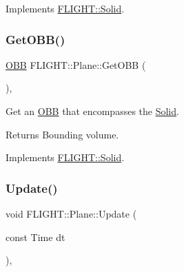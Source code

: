 Implements \hyperlink{class_f_l_i_g_h_t_1_1_solid_ae5db89380caf480ae8f5b203dab13e5b}{F\+L\+I\+G\+H\+T\+::\+Solid}.

\mbox{\label{class_f_l_i_g_h_t_1_1_plane_aaef56e8e418918a941ae740bbc818518}} 
\subsubsection{\texorpdfstring{Get\+O\+B\+B()}{GetOBB()}}
{\footnotesize\ttfamily \hyperlink{class_f_l_i_g_h_t_1_1_o_b_b}{O\+BB} F\+L\+I\+G\+H\+T\+::\+Plane\+::\+Get\+O\+BB (\begin{DoxyParamCaption}{ }\end{DoxyParamCaption})\hspace{0.3cm}{\ttfamily [override]}, {\ttfamily [virtual]}}



Get an \hyperlink{class_f_l_i_g_h_t_1_1_o_b_b}{O\+BB} that encompasses the \hyperlink{class_f_l_i_g_h_t_1_1_solid}{Solid}. 

\begin{DoxyReturn}{Returns}
Bounding volume. 
\end{DoxyReturn}


Implements \hyperlink{class_f_l_i_g_h_t_1_1_solid_a8234bad63b8aff2f613407d80eee4bef}{F\+L\+I\+G\+H\+T\+::\+Solid}.

\mbox{\label{class_f_l_i_g_h_t_1_1_plane_a53d47170a7314c523f91e8dc26a5a9ab}} 
\subsubsection{\texorpdfstring{Update()}{Update()}}
{\footnotesize\ttfamily void F\+L\+I\+G\+H\+T\+::\+Plane\+::\+Update (\begin{DoxyParamCaption}\item[{const Time}]{dt }\end{DoxyParamCaption})\hspace{0.3cm}{\ttfamily [override]}, {\ttfamily [virtual]}}




